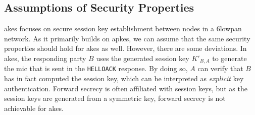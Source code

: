 



\subsection{Assumptions of Security Properties}
\label{subsec:akes-props}

\gls{akes} focuses on secure session key establishment between nodes in a \gls{6lowpan} network. As it primarily builds on \gls{apkes}, we can assume that the same security properties should hold for \gls{akes} as well. However, there are some deviations. In \gls{akes}, the responding party $B$ uses the generated session key $K'_{B,A}$ to generate the \gls{mic} that is sent in the \texttt{HELLOACK} response. By doing so, $A$ can verify that $B$ has in fact computed the session key, which can be interpreted as \emph{explicit} key authentication. Forward secrecy is often affiliated with session keys, but as the session keys are generated from a symmetric key, forward secrecy is not achievable for \gls{akes}. 



